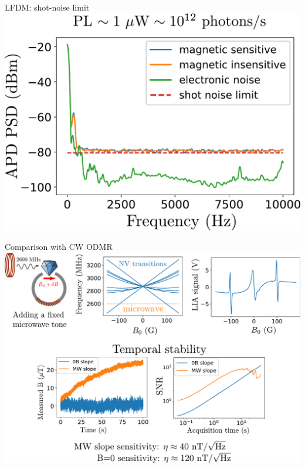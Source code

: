 \documentclass{beamer}
\begin{document}
\begin{frame}{LFDM: shot-noise limit}
\centering
\includegraphics[width=\textwidth,height=0.5\textheight,keepaspectratio]{Slide_bonus_shot_noise_limit}
\end{frame}

\begin{frame}{Comparison with CW ODMR}
\centering
\includegraphics[width=\textwidth,height=0.85\textheight,keepaspectratio]{Slide_comparison_microwave}
\end{frame}
\end{document}
